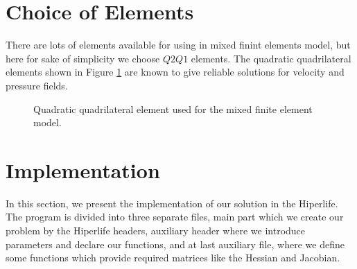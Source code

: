 \documentclass[]{article}
\begin{document}
\section{Choice of Elements} \label{sec: elem}
There are lots of elements available for using in mixed finint elements model, but here for sake of simplicity we choose $Q2Q1$ elements. The quadratic quadrilateral elements shown in Figure \ref{fig_elem} are known to give reliable solutions for velocity and pressure fields.
\begin{figure}[htbp]
	\centering
	
	\caption{Quadratic quadrilateral element used for the mixed finite element model.}
	\label{fig_elem}
\end{figure}
\section{Implementation} \label{sec: imp}
In this section, we present the implementation of our solution in the Hiperlife. The program is divided into three separate files, main part which we create our problem by the Hiperlife headers, auxiliary header where we introduce parameters and declare our functions, and at last auxiliary file, where we define some functions which provide required matrices like the Hessian and Jacobian.
\end{document}
